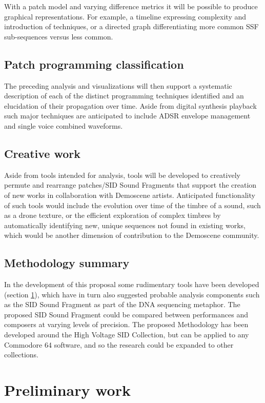 \documentclass[10pt]{article}
\begin{document}
\begin{multicols*}{2}
With a patch model and varying difference metrics it will be possible to produce graphical representations. For example, a timeline expressing complexity and introduction of techniques, or a directed graph differentiating more common SSF sub-sequences versus less common.

\subsection{Patch programming classification}

The preceding analysis and visualizations will then support a systematic description of each of the distinct programming techniques identified and an elucidation of their propagation over time. Aside from digital synthesis playback such major techniques are anticipated to include ADSR envelope management and single voice combined waveforms.

\subsection{Creative work}

Aside from tools intended for analysis, tools will be developed to creatively permute and rearrange patches/SID Sound Fragments that support the creation of new works in collaboration with Demoscene artists. Anticipated functionality of such tools would include the evolution over time of the timbre of a sound, such as a drone texture, or the efficient exploration of complex timbres by automatically identifying new, unique sequences not found in existing works, which would be another dimension of contribution to the Demoscene community.

\subsection{Methodology summary}

In the development of this proposal some rudimentary tools have been developed (section \ref{prelim}), which have in turn also suggested probable analysis components such as the SID Sound Fragment as part of the DNA sequencing metaphor. The proposed SID Sound Fragment could be compared between performances and composers at varying levels of precision. The proposed Methodology has been developed around the High Voltage SID Collection, but can be applied to any Commodore 64 software, and so the research could be expanded to other collections.

\section{Preliminary work}
\label{prelim}


\end{multicols*}
\end{document}
